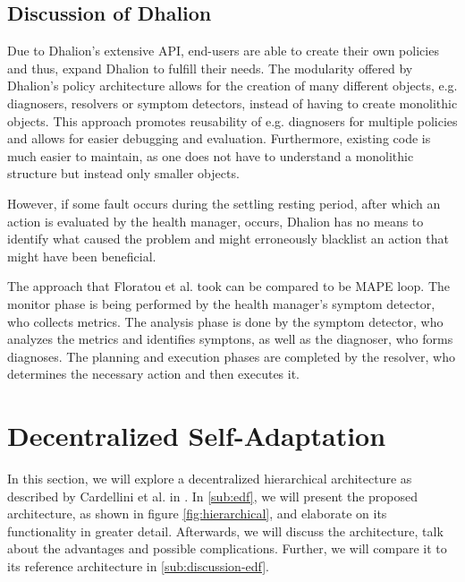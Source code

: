         \subsection{Discussion of Dhalion}
        \label{sub:dhalion-discussion}
        Due to Dhalion's extensive API, end-users are able to create their own policies and thus, expand Dhalion to fulfill their needs. 
        The modularity offered by Dhalion's policy architecture allows for the creation of many different objects, e.g. diagnosers, resolvers or symptom detectors, 
        instead of having to create monolithic objects.
        This approach promotes reusability of e.g. diagnosers for multiple policies and allows for easier debugging and evaluation.
        Furthermore, existing code is much easier to maintain, as one does not have to understand a monolithic structure but instead only smaller objects.
        
        \quad However, if some fault occurs during the settling resting period, after which an action is evaluated by the health manager, occurs, Dhalion has no means to 
        identify what caused the problem and might erroneously blacklist an action that might have been beneficial.

        \quad The approach that Floratou et al. took can be compared to be MAPE loop. The monitor phase is being performed by the health manager's symptom detector, who collects metrics.
        The analysis phase is done by the symptom detector, who analyzes the metrics and identifies symptons, as well as the diagnoser, who forms diagnoses.
        The planning and execution phases are completed by the resolver, who determines the necessary action and then executes it.

    \section{Decentralized Self-Adaptation}
    \label{sec:hierarchical}
    In this section, we will explore a decentralized hierarchical architecture as described by Cardellini et al. in \cite{cardellini}.
    In \ref{sub:edf}, we will present the proposed architecture, as shown in figure \ref{fig:hierarchical}, and elaborate on its functionality in greater detail.
    Afterwards, we will discuss the architecture, talk about the advantages and possible complications. Further, we will compare it to its reference architecture in \ref{sub:discussion-edf}.


